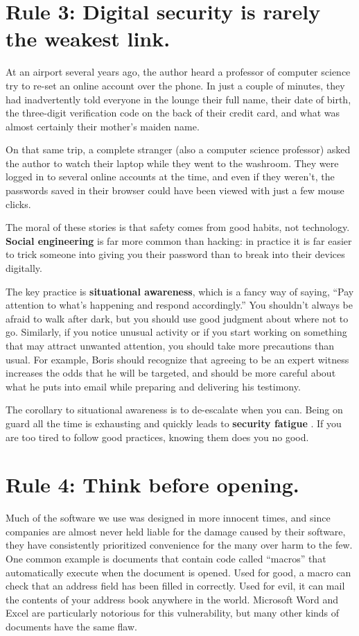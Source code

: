 \documentclass[10pt,letterpaper]{article}
\newcommand{\rulemajor}[1]{\section*{#1}}
\begin{document}
\rulemajor{Rule 3: Digital security is rarely the weakest link.}

At an airport several years ago,
the author heard a professor of computer science try to re-set an online account over the phone.
In just a couple of minutes,
they had inadvertently told everyone in the lounge their full name,
their date of birth,
the three-digit verification code on the back of their credit card,
and what was almost certainly their mother's maiden name.

On that same trip,
a complete stranger (also a computer science professor)
asked the author to watch their laptop while they went to the washroom.
They were logged in to several online accounts at the time,
and even if they weren't,
the passwords saved in their browser could have been viewed with just a few mouse clicks.

The moral of these stories is that safety comes from good habits,
not technology.
\textbf{Social engineering} is far more common than hacking:
in practice it is far easier to trick someone into giving you their password
than to break into their devices digitally.

The key practice is \textbf{situational awareness},
which is a fancy way of saying,
``Pay attention to what's happening and respond accordingly.''
You shouldn't always be afraid to walk after dark,
but you should use good judgment about where not to go.
Similarly,
if you notice unusual activity or if you start working on something that may attract unwanted attention,
you should take more precautions than usual.
For example,
Boris should recognize that agreeing to be an expert witness
increases the odds that he will be targeted,
and should be more careful about what he puts into email while preparing and delivering his testimony.

The corollary to situational awareness is to de-escalate when you can.
Being on guard all the time is exhausting
and quickly leads to \textbf{security fatigue} \cite{Stan2016}.
If you are too tired to follow good practices,
knowing them does you no good.

\rulemajor{Rule 4: Think before opening.}

Much of the software we use was designed in more innocent times,
and since companies are almost never held liable for the damage caused by their software,
they have consistently prioritized convenience for the many over harm to the few.
One common example is documents that contain code called ``macros''
that automatically execute when the document is opened.
Used for good,
a macro can check that an address field has been filled in correctly.
Used for evil,
it can mail the contents of your address book anywhere in the world.
Microsoft Word and Excel are particularly notorious for this vulnerability,
but many other kinds of documents have the same flaw.
\end{document}
